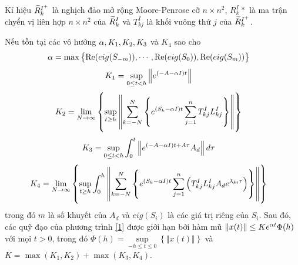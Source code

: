 % 
Kí hiệu $\widetilde{R}_k^{I^+}$ là nghịch đảo mở rộng Moore-Penrose cỡ $n \times n^2$, $R^I_k*$ là ma trận chyển vị liên hợp $n \times n^2$ của $\widetilde{R}^I_k$ và $T_{kj}^I$ là khối vuông thứ $j$ của $\widetilde{R}_k^{I^+}$.\\
%
\begin{dly}\label{dly1}
Nếu tồn tại các vô hướng $\alpha, K_1, K_2, K_3$ và $K_4$ sao cho
\begin{align}\label{17}
	&\alpha = \max \left\{\mathrm{Re}(eig(S_{-m})), \cdots, \mathrm{Re}(eig(S_{0})), \mathrm{Re}(eig(S_{m})) \right\}
\end{align}
\begin{align}\label{18}
	&K_1 = \sup\limits_{0 \le t <h} \left \Vert e^{(-A - \alpha I)t} \right\Vert
\end{align}
\begin{align}\label{19}
	&K_2 = \lim\limits_{N \to \infty} \left\{ \sup\limits_{t \ge h} \left\Vert \sum_{k=-N}^{N} \left\{e^{(S_k-\alpha I)t} \sum_{j=1}^{n} T^I_{kj}L^I_{kj}\right\} \right\Vert\right\}
\end{align}	
\begin{align}\label{20}
	&K_3 = \sup \limits_{0 \le t <h} \int_0^t \left\Vert e^{(-A-\alpha I)t +A \tau}A_d \right\Vert d\tau 
\end{align}
\begin{align}\label{21}
	&K_4 = \lim\limits_{N \to \infty} \left\{\sup\limits_{t \ge h} \int_{0}^{h} \left \Vert \sum_{k=-N}^{N} \left\{e^{(S_k-\alpha I)t} \sum_{j =1}^{n} \left(T^I_{kj}L^I_{kj}A_de^{\lambda_{ki}\tau} \right) \right\} \right \Vert \right\}
\end{align}
%
trong đó $m$ là số khuyết của $A_d$ và $eig(S_i)$ là các giá trị riêng của $S_i$. Sau đó, các quỹ đạo của phương trình \ref{1} được giới hạn bởi hàm mũ $\Vert x(t) \Vert \le Ke^{\alpha t}\Phi(h)$ với mọi $t >0$, trong đó $\Phi(h) = \sup\limits_{-h \le t \le 0} \left\{\Vert x(t) \Vert \right\} $ và $K = \max (K_1, K_2) + \max(K_3, K_4)$.
\end{dly}
